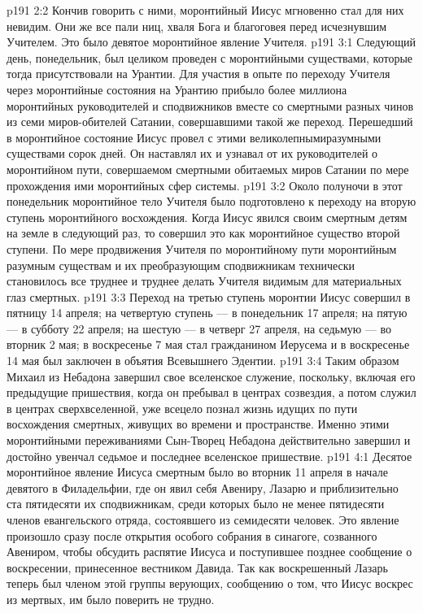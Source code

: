 \vs p191 2:2 Кончив говорить с ними, моронтийный Иисус мгновенно стал для них невидим. Они же все пали ниц, хваля Бога и благоговея перед исчезнувшим Учителем. Это было девятое моронтийное явление Учителя.
\vs p191 3:1 Следующий день, понедельник, был целиком проведен с моронтийными существами, которые тогда присутствовали на Урантии. Для участия в опыте по переходу Учителя через моронтийные состояния на Урантию прибыло более миллиона моронтийных руководителей и сподвижников вместе со смертными разных чинов из семи миров\hyp{}обителей Сатании, совершавшими такой же переход. Перешедший в моронтийное состояние Иисус провел с этими великолепнымиразумными существами сорок дней. Он наставлял их и узнавал от их руководителей о моронтийном пути, совершаемом смертными обитаемых миров Сатании по мере прохождения ими моронтийных сфер системы.
\vs p191 3:2 Около полуночи в этот понедельник моронтийное тело Учителя было подготовлено к переходу на вторую ступень моронтийного восхождения. Когда Иисус явился своим смертным детям на земле в следующий раз, то совершил это как моронтийное существо второй ступени. По мере продвижения Учителя по моронтийному пути моронтийным разумным существам и их преобразующим сподвижникам технически становилось все труднее и труднее делать Учителя видимым для материальных глаз смертных.
\vs p191 3:3 Переход на третью ступень моронтии Иисус совершил в пятницу 14 апреля; на четвертую ступень --- в понедельник 17 апреля; на пятую --- в субботу 22 апреля; на шестую --- в четверг 27 апреля, на седьмую --- во вторник 2 мая; в воскресенье 7 мая стал гражданином Иерусема и в воскресенье 14 мая был заключен в объятия Всевышнего Эдентии.
\vs p191 3:4 Таким образом Михаил из Небадона завершил свое вселенское служение, поскольку, включая его предыдущие пришествия, когда он пребывал в центрах созвездия, а потом служил в центрах сверхвселенной, уже всецело познал жизнь идущих по пути восхождения смертных, живущих во времени и пространстве. Именно этими моронтийными переживаниями Сын\hyp{}Творец Небадона действительно завершил и достойно увенчал седьмое и последнее вселенское пришествие.
\vs p191 4:1 Десятое моронтийное явление Иисуса смертным было во вторник 11 апреля в начале девятого в Филадельфии, где он явил себя Авениру, Лазарю и приблизительно ста пятидесяти их сподвижникам, среди которых было не менее пятидесяти членов евангельского отряда, состоявшего из семидесяти человек. Это явление произошло сразу после открытия особого собрания в синагоге, созванного Авениром, чтобы обсудить распятие Иисуса и поступившее позднее сообщение о воскресении, принесенное вестником Давида. Так как воскрешенный Лазарь теперь был членом этой группы верующих, сообщению о том, что Иисус воскрес из мертвых, им было поверить не трудно.
